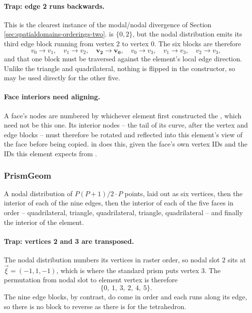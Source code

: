 \paragraph{Trap: edge 2 runs backwards.}  This is the clearest instance of the
modal/nodal divergence of Section
\ref{sec:spatialdomains-orderings-two}.   is
$\{0,2\}$, but the nodal distribution emits its third edge block running from
vertex $2$ to vertex $0$.  The six blocks are therefore
%
$$
v_0 \! \to \! v_1,\quad v_1 \! \to \! v_2,\quad \mathbf{v_2 \! \to \! v_0},
\quad v_0 \! \to \! v_3,\quad v_1 \! \to \! v_3,\quad v_2 \! \to \! v_3,
$$
%
and that one block must be traversed against the element's local edge
direction.  Unlike the triangle and quadrilateral, nothing is flipped in the
constructor, so  may be used directly for the other five.

\paragraph{Face interiors need aligning.}  A face's nodes are numbered by
whichever element first constructed the , which need not be this
one.  Its interior nodes -- the tail of its curve, after the vertex and edge
blocks -- must therefore be rotated and reflected into this element's view of
the face before being copied.   in
 does this, given the face's own vertex IDs
and the IDs this element expects from .

\subsubsection{PrismGeom}

A nodal distribution of $P(P+1)/2 \cdot P$ points, laid out as six vertices,
then the interior of each of the nine edges, then the interior of each of the
five faces in  order -- quadrilateral, triangle,
quadrilateral, triangle, quadrilateral -- and finally the interior of the
element.

\paragraph{Trap: vertices 2 and 3 are transposed.}  The nodal distribution
numbers its vertices in raster order, so nodal slot $2$ sits at
$\vec{\xi} = (-1, 1, -1)$, which is where the standard prism puts vertex $3$.
The permutation from nodal slot to element vertex is therefore
%
$$
\{0,\ 1,\ 3,\ 2,\ 4,\ 5\}.
$$
%
The nine edge blocks, by contrast, do come in  order and each
runs along its edge, so there is no block to reverse as there is for the
tetrahedron.

